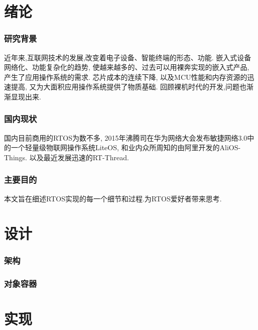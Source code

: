 
\iffalse
\fi


\chapter{绪论}
\subsection{研究背景}
近年来,互联网技术的发展,改变着电子设备、智能终端的形态、功能.
嵌入式设备网络化、功能复杂化的趋势,
使越来越多的、过去可以用裸奔实现的嵌入式产品,
产生了应用操作系统的需求.
芯片成本的连续下降,
以及MCU性能和内存资源的迅速提高,
又为大面积应用操作系统提供了物质基础.
回顾裸机时代的开发,问题也渐渐显现出来.

\subsection{国内现状}
国内目前商用的RTOS为数不多,
2015年沸腾司在华为网络大会发布敏捷网络3.0中的一个轻量级物联网操作系统LiteOS,
和业内众所周知的由阿里开发的AliOS-Things.
以及最近发展迅速的RT-Thread.

\subsection{主要目的}
本文旨在细述RTOS实现的每一个细节和过程.为RTOS爱好者带来思考.


\chapter{设计}
\subsection{架构}
\subsection{对象容器}


\chapter{实现}

